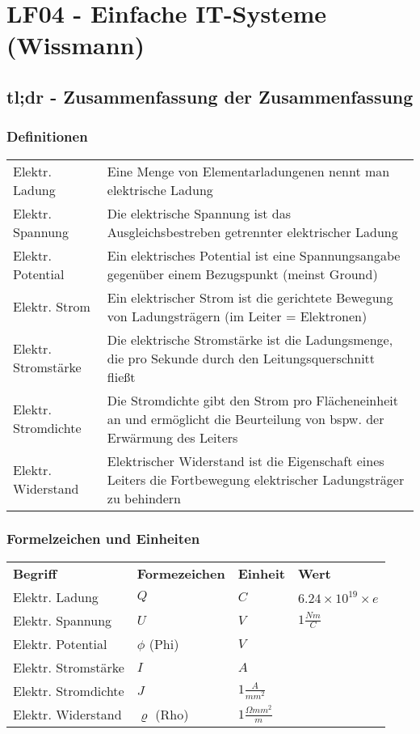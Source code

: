 \section{LF04 - Einfache IT-Systeme (Wissmann)}


\subsection{tl;dr - Zusammenfassung der Zusammenfassung}

\subsubsection{Definitionen}
\begin{tabular}{	p{}
				p{}}
Elektr. Ladung & Eine Menge von Elementarladungenen nennt man elektrische Ladung\\
Elektr. Spannung & Die elektrische Spannung ist das Ausgleichsbestreben getrennter elektrischer Ladung\\
Elektr. Potential & Ein elektrisches Potential ist eine Spannungsangabe gegenüber einem Bezugspunkt (meinst Ground)\\
Elektr. Strom & Ein elektrischer Strom ist die gerichtete Bewegung von Ladungsträgern (im Leiter = Elektronen)\\
Elektr. Stromstärke & Die elektrische Stromstärke ist die Ladungsmenge, die pro Sekunde durch den Leitungsquerschnitt fließt\\
Elektr. Stromdichte & Die Stromdichte gibt den Strom pro Flächeneinheit an und ermöglicht die Beurteilung von bspw. der Erwärmung des Leiters\\
Elektr. Widerstand & Elektrischer Widerstand ist die Eigenschaft eines Leiters die Fortbewegung elektrischer Ladungsträger zu behindern\\
\end{tabular}

\subsubsection{Formelzeichen und Einheiten}
\begin{tabular}{llll}
{\bf Begriff} & {\bf Formezeichen} & {\bf Einheit} & {\bf Wert}\\
Elektr. Ladung & $Q$ & $C$ & $6.24 \times 10^{19} \times e$\\
Elektr. Spannung & $U$ & $V$ & $1\frac{Nm}{C}$\\
Elektr. Potential & $\phi$ (Phi) & $V$ & \\
Elektr. Stromstärke & $I$ & $A$ & \\
Elektr. Stromdichte & $J$ & $1\frac{A}{mm^2}$ & \\
Elektr. Widerstand & $\varrho$ (Rho) & $1\frac{\Omega mm^2}{m}$ & \\
\end{tabular}

